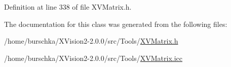 Definition at line 338 of file XVMatrix.h.

The documentation for this class was generated from the following files:\begin{CompactItemize}
\item 
/home/burschka/XVision2-2.0.0/src/Tools/\hyperlink{XVMatrix.h-source}{XVMatrix.h}\item 
/home/burschka/XVision2-2.0.0/src/Tools/\hyperlink{XVMatrix.icc-source}{XVMatrix.icc}\end{CompactItemize}
